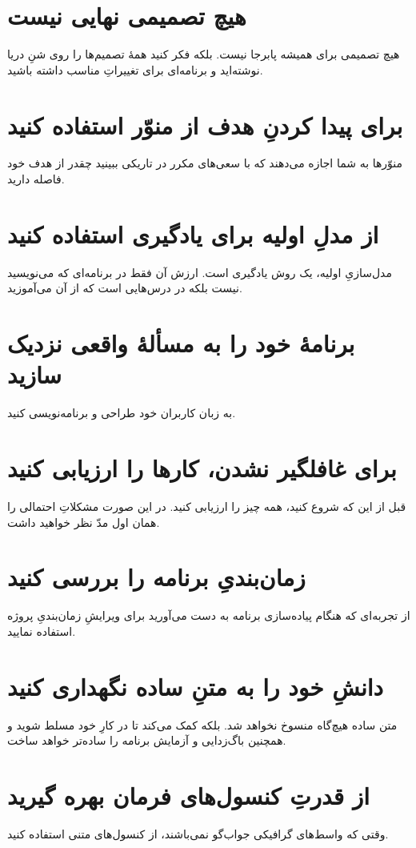 \documentclass[10pt, a4paper]{book}
\begin{document}
    \section{هیچ تصمیمی نهایی نیست}
    هیچ تصمیمی برای همیشه پابرجا نیست. بلکه فکر کنید همهٔ تصمیم‌ها را روی شنِ دریا نوشته‌اید و برنامه‌ای برای تغییراتِ مناسب داشته باشید.

    \section{برای پیدا کردنِ هدف از منوّر استفاده کنید}
    منوّرها به شما اجازه می‌دهند که با سعی‌های مکرر در تاریکی ببینید چقدر از هدف خود فاصله دارید.

    \section{از مدلِ اولیه برای یادگیری استفاده کنید}
    مدل‌سازیِ اولیه، یک روش یادگیری است. ارزش آن فقط در برنامه‌ای که می‌نویسید نیست بلکه در درس‌هایی است که از آن می‌آموزید.

    \section{برنامهٔ خود را به مسألهٔ واقعی نزدیک سازید}
    به زبان کاربران خود طراحی و برنامه‌نویسی کنید.

    \section{برای غافلگیر نشدن، کارها را ارزیابی کنید}
    قبل از این که شروع کنید، همه چیز را ارزیابی کنید. در این صورت مشکلاتِ احتمالی را همان اول مدّ نظر خواهید داشت.

    \section{زمان‌بندیِ برنامه را بررسی کنید}
    از تجربه‌ای که هنگام پیاده‌سازی برنامه به دست می‌آورید برای ویرایشِ زمان‌بندیِ پروژه استفاده نمایید.

    \section{دانشِ خود را به متنِ ساده نگهداری کنید}
    متن ساده هیچ‌گاه منسوخ نخواهد شد. بلکه کمک می‌کند تا در کارِ خود مسلط شوید و همچنین باگ‌زدایی و آزمایش برنامه را ساده‌تر خواهد ساخت.

    \section{از قدرتِ کنسول‌های فرمان بهره گیرید}
    وقتی که واسط‌های گرافیکی جواب‌گو نمی‌باشند، از کنسول‌های متنی استفاده کنید.
\end{document}
